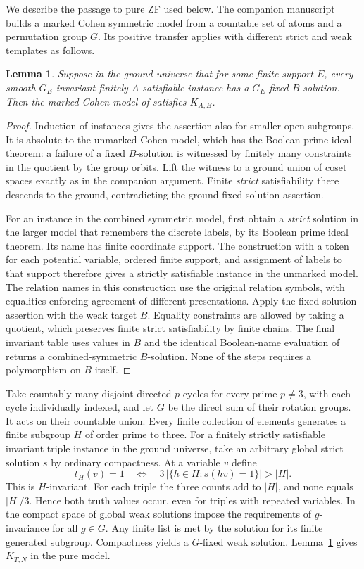\documentclass[11pt]{article}
\newtheorem{lemma}[theorem]{Lemma}
\begin{document}
We describe the passage to pure ZF used below. The companion manuscript \cite[Theorem 4 and the positive-instance construction]{companion} builds a marked Cohen symmetric model from a countable set of atoms and a permutation group $G$. Its positive transfer applies with different strict and weak templates as follows.

\begin{lemma}\label{lifting}
Suppose in the ground universe that for some finite support $E$, every smooth $G_E$-invariant finitely $A$-satisfiable instance has a $G_E$-fixed $B$-solution. Then the marked Cohen model of \cite{companion} satisfies $K_{A,B}$.
\end{lemma}
\begin{proof}
Induction of instances gives the assertion also for smaller open subgroups. It is absolute to the unmarked Cohen model, which has the Boolean prime ideal theorem: a failure of a fixed $B$-solution is witnessed by finitely many constraints in the quotient by the group orbits. Lift the witness to a ground union of coset spaces exactly as in the companion argument. Finite \emph{strict} satisfiability there descends to the ground, contradicting the ground fixed-solution assertion.

For an instance in the combined symmetric model, first obtain a \emph{strict} solution in the larger model that remembers the discrete labels, by its Boolean prime ideal theorem. Its name has finite coordinate support. The construction with a token for each potential variable, ordered finite support, and assignment of labels to that support therefore gives a strictly satisfiable instance in the unmarked model. The relation names in this construction use the original relation symbols, with equalities enforcing agreement of different presentations. Apply the fixed-solution assertion with the weak target $B$. Equality constraints are allowed by taking a quotient, which preserves finite strict satisfiability by finite chains. The final invariant table uses values in $B$ and the identical Boolean-name evaluation of \cite{companion} returns a combined-symmetric $B$-solution. None of the steps requires a polymorphism on $B$ itself.
\end{proof}

Take countably many disjoint directed $p$-cycles for every prime $p\ne3$, with each cycle individually indexed, and let $G$ be the direct sum of their rotation groups. It acts on their countable union. Every finite collection of elements generates a finite subgroup $H$ of order prime to three. For a finitely strictly satisfiable invariant triple instance in the ground universe, take an arbitrary global strict solution $s$ by ordinary compactness. At a variable $v$ define
\[
 t_H(v)=1\quad\Longleftrightarrow\quad
 3\,|\{h\in H:s(hv)=1\}|>|H|.
\]
This is $H$-invariant. For each triple the three counts add to $|H|$, and none equals $|H|/3$. Hence both truth values occur, even for triples with repeated variables. In the compact space of global weak solutions impose the requirements of $g$-invariance for all $g\in G$. Any finite list is met by the solution for its finite generated subgroup. Compactness yields a $G$-fixed weak solution. Lemma~\ref{lifting} gives $K_{T,N}$ in the pure model.
\end{document}
